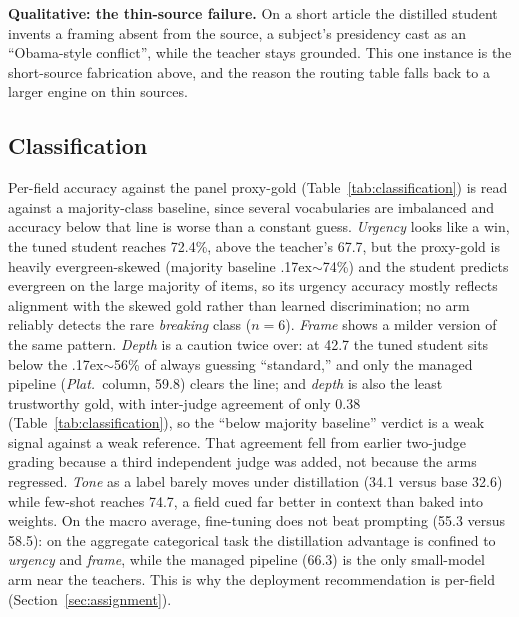 \documentclass[10pt,journal]{IEEEtran}
\begin{document}
\textbf{Qualitative: the thin-source failure.} On a short article the distilled student invents a framing absent from the source, a subject's presidency cast as an ``Obama-style conflict'', while the teacher stays grounded. This one instance is the short-source fabrication above, and the reason the routing table falls back to a larger engine on thin sources.

\subsection{Classification}\label{sec:classification}
Per-field accuracy against the panel proxy-gold (Table~\ref{tab:classification}) is read against a majority-class baseline, since several vocabularies are imbalanced and accuracy below that line is worse than a constant guess. \emph{Urgency} looks like a win, the tuned student reaches 72.4\%, above the teacher's 67.7, but the proxy-gold is heavily evergreen-skewed (majority baseline {\raise.17ex\hbox{$\scriptstyle\sim$}}74\%) and the student predicts evergreen on the large majority of items, so its urgency accuracy mostly reflects alignment with the skewed gold rather than learned discrimination; no arm reliably detects the rare \emph{breaking} class ($n=6$). \emph{Frame} shows a milder version of the same pattern. \emph{Depth} is a caution twice over: at 42.7 the tuned student sits below the {\raise.17ex\hbox{$\scriptstyle\sim$}}56\% of always guessing ``standard,'' and only the managed pipeline (\emph{Plat.}\ column, 59.8) clears the line; and \emph{depth} is also the least trustworthy gold, with inter-judge agreement of only 0.38 (Table~\ref{tab:classification}), so the ``below majority baseline'' verdict is a weak signal against a weak reference. That agreement fell from earlier two-judge grading because a third independent judge was added, not because the arms regressed. \emph{Tone} as a label barely moves under distillation (34.1 versus base 32.6) while few-shot reaches 74.7, a field cued far better in context than baked into weights. On the macro average, fine-tuning does not beat prompting (55.3 versus 58.5): on the aggregate categorical task the distillation advantage is confined to \emph{urgency} and \emph{frame}, while the managed pipeline (66.3) is the only small-model arm near the teachers. This is why the deployment recommendation is per-field (Section~\ref{sec:assignment}).
\end{document}
